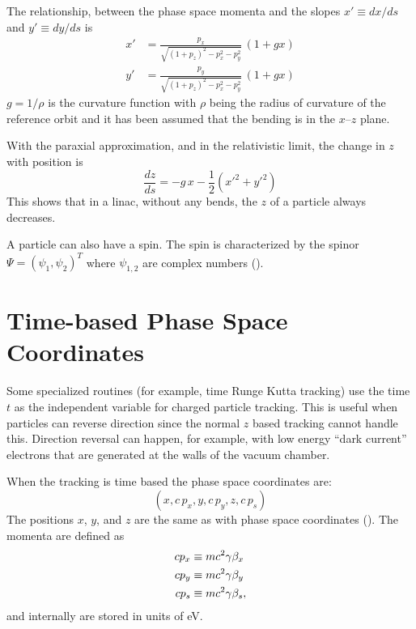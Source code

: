 The relationship, between the phase space momenta and the slopes $x' \equiv dx/ds$ and $y' \equiv dy/ds$
is
\begin{align}
  x' &= \frac{p_x}{\sqrt{(1 + p_z)^2 - p_x^2 - p_y^2}} \, (1 + g x) \\
  y' &= \frac{p_y}{\sqrt{(1 + p_z)^2 - p_x^2 - p_y^2}} \, (1 + g x) 
  \label{xpa1p}
\end{align}
$g = 1/\rho$ is the curvature function with $\rho$ being the radius of curvature of the reference
orbit and it has been assumed that the bending is in the $x$--$z$ plane.

With the paraxial approximation, and in the relativistic limit, the change in $z$ with position is
\begin{equation}
  \frac{dz}{ds} = -g \, x - \frac{1}{2} (x'^2 + y'^2)
\end{equation}
This shows that in a linac, without any bends, the $z$ of a particle always decreases.

A particle can also have a spin. The spin is characterized by the spinor $\Psi = \left( \psi_{1},
\psi_{2} \right)^{T}$ where $\psi_{1,2}$ are complex numbers ().

\section{Time-based Phase Space Coordinates}
\label{s:time.phase.space}

Some specialized routines (for example, time Runge Kutta tracking) use the time $t$ as the
independent variable for charged particle tracking. This is useful when particles can reverse
direction since the normal $z$ based tracking cannot handle this. Direction reversal can happen, for
example, with low energy ``dark current'' electrons that are generated at the walls of the vacuum
chamber.

When the tracking is time based the phase space coordinates are:
\begin{equation}
  (x, c \, p_x, y, c \, p_y, z, c \, p_s)
\end{equation}
The positions $x$, $y$, and $z$ are the same as with phase space coordinates
(). The momenta are defined as
\begin{align}
c p_x &\equiv m c^2 \gamma \beta_x \nonumber \\
c p_y &\equiv m c^2 \gamma \beta_y \\
c p_s &\equiv m c^2 \gamma \beta_s, \nonumber
\end{align}
and internally are stored in units of eV.

